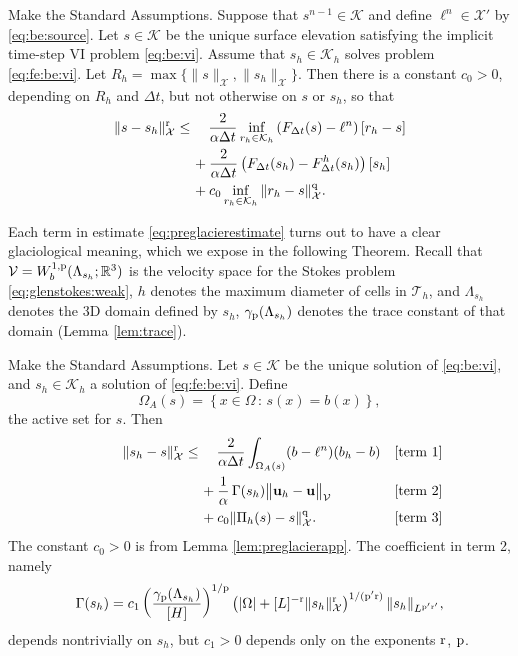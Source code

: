 \documentclass[hidelinks,onefignum,onetabnum,final]{siamart220329}  %
\newcommand{\RR}{\mathbb{R}}
\newcommand{\bu}{\mathbf{u}}
\newcommand{\cK}{\mathcal{K}}
\newcommand{\cT}{\mathcal{T}}
\newcommand{\cV}{\mathcal{V}}
\newcommand{\cX}{\mathcal{X}}
\newcommand{\pp}{{\text{\textnormal{p}}}}
\newcommand{\qq}{{\text{\textnormal{q}}}}
\newcommand{\rr}{{\text{\textnormal{r}}}}
\begin{document}
\begin{lemma} \label{lem:preglacierapp}  Make the Standard Assumptions.  Suppose that $s^{n-1}\in\cK$ and define $\ell^n \in \cX'$ by \eqref{eq:be:source}.  Let $s\in\cK$ be the unique surface elevation satisfying the implicit time-step VI problem \eqref{eq:be:vi}.  Assume that $s_h\in\cK_h$ solves problem \eqref{eq:fe:be:vi}.  Let $R_h=\max\{\|s\|_\cX,\|s_h\|_\cX\}$.  Then there is a constant $c_0>0$, depending on $R_h$ and $\Delta t$, but not otherwise on $s$ or $s_h$, so that
\begin{align}
\|s-s_h\|_\cX^\rr &\le \quad \frac{2}{\alpha \Delta t} \inf_{r_h\in\cK_h} \left(F_{\Delta t}(s)-\ell^n\right)[r_h-s] \label{eq:preglacierestimate} \\
   &\quad\, + \frac{2}{\alpha \Delta t} \left(F_{\Delta t}(s_h)-F^h_{\Delta t}(s_h)\right)[s_h] \notag \\
   &\quad\, + c_0 \inf_{r_h\in\cK_h} \|r_h - s\|_{\cX}^\qq. \notag
\end{align}
\end{lemma}

Each term in estimate \eqref{eq:preglacierestimate} turns out to have a clear glaciological meaning, which we expose in the following Theorem.  Recall that $\cV=W_b^{1,\pp}(\Lambda_{s_h}; \RR^3)$ is the velocity space for the Stokes problem \eqref{eq:glenstokes:weak}, $h$ denotes the maximum diameter of cells in $\cT_h$, and $\Lambda_{s_h}$ denotes the 3D domain defined by $s_h$, $\gamma_\pp(\Lambda_{s_h})$ denotes the trace constant of that domain (Lemma \ref{lem:trace}).

\begin{theorem} \label{thm:glacierapp}  Make the Standard Assumptions.  Let $s\in\cK$ be the unique solution of \eqref{eq:be:vi}, and $s_h\in\cK_h$ a solution of \eqref{eq:fe:be:vi}.  Define
\begin{equation}
\Omega_A(s) = \left\{x\in\Omega\,:\,s(x)=b(x)\right\},
\end{equation}
the active set for $s$.  Then
\begin{align}
\phantom{dfkljsd} \|s_h-s\|_\cX^\rr &\le \quad \frac{2}{\alpha \Delta t} \int_{\Omega_A(s)} (b - \ell^n) (b_h - b) &&\text{\textnormal{[term 1]}} \label{eq:glacierestimate} \\
   &\quad\, + \frac{1}{\alpha} \, \Gamma(s_h) \big\|\bu_h - \bu\big\|_{\cV} &&\text{\textnormal{[term 2]}} \notag \\
   &\quad\, + c_0 \|\Pi_h(s) - s\|_\cX^\qq. &&\text{\textnormal{[term 3]}} \notag
\end{align}
The constant $c_0>0$ is from Lemma \ref{lem:preglacierapp}.  The coefficient in term 2, namely
\begin{equation}
\Gamma(s_h) = c_1 \left(\frac{\gamma_\pp(\Lambda_{s_h})}{[H]}\right)^{1/\pp} \left(|\Omega| + [L]^{-\rr}\|s_h\|_{\cX}^\rr\right)^{1/(\pp'\rr)} \|s_h\|_{L^{\pp'\rr'}},
\end{equation}
depends nontrivially on $s_h$, but $c_1>0$ depends only on the exponents $\rr$, $\pp$.
\end{theorem}
\end{document}
